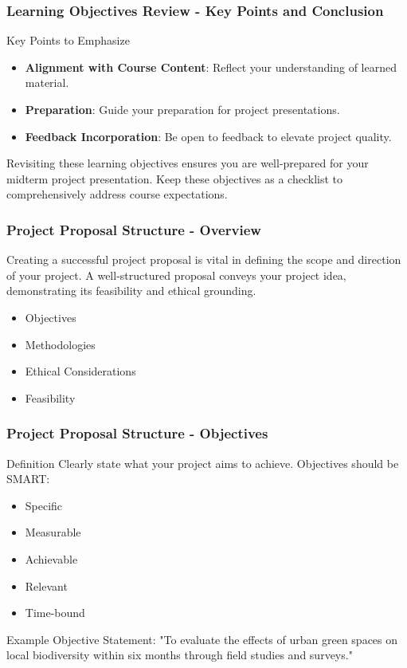 \documentclass[aspectratio=169]{beamer}
\begin{document}
\begin{frame}[fragile]
    \frametitle{Learning Objectives Review - Key Points and Conclusion}
    \begin{block}{Key Points to Emphasize}
        \begin{itemize}
            \item \textbf{Alignment with Course Content}: Reflect your understanding of learned material.
            \item \textbf{Preparation}: Guide your preparation for project presentations.
            \item \textbf{Feedback Incorporation}: Be open to feedback to elevate project quality.
        \end{itemize}
    \end{block}

    Revisiting these learning objectives ensures you are well-prepared for your midterm project presentation. 
    Keep these objectives as a checklist to comprehensively address course expectations.
\end{frame}

\begin{frame}[fragile]
    \frametitle{Project Proposal Structure - Overview}
    Creating a successful project proposal is vital in defining the scope and direction of your project. 
    A well-structured proposal conveys your project idea, demonstrating its feasibility and ethical grounding.
    \begin{itemize}
        \item Objectives
        \item Methodologies
        \item Ethical Considerations
        \item Feasibility
    \end{itemize}
\end{frame}

\begin{frame}[fragile]
    \frametitle{Project Proposal Structure - Objectives}
    \begin{block}{Definition}
        Clearly state what your project aims to achieve. Objectives should be SMART:
        \begin{itemize}
            \item Specific
            \item Measurable
            \item Achievable
            \item Relevant
            \item Time-bound
        \end{itemize}
    \end{block}
    
    \begin{block}{Example}
        Objective Statement: 
        "To evaluate the effects of urban green spaces on local biodiversity within six months
        through field studies and surveys."
    \end{block}
\end{frame}
\end{document}
